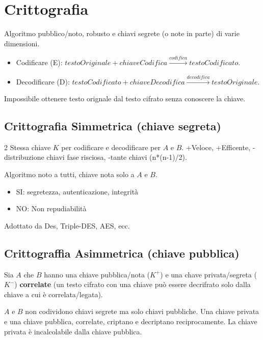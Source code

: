 \section{Crittografia}
Algoritmo pubblico/noto, robusto e chiavi segrete (o note in parte) di varie dimensioni.
\begin{itemize}
	\item Codificare (E): $testoOriginale + chiaveCodifica \stackrel{codifica}{\longrightarrow} testoCodificato$.
	\item Decodificare (D): $testoCodificato + chiaveDecodifica \stackrel{decodifica}{\longrightarrow} testoOriginale$.
\end{itemize}
Impossibile ottenere testo orignale dal testo cifrato senza conoscere la chiave.

\subsection{Crittografia Simmetrica (chiave segreta)}
\begin{multicols}{2}
	\noindent Stessa chiave $K$ per codificare e decodificare per $A$ e $B$.
	+Veloce, +Efficente, -distribuzione chiavi fase risciosa, -tante chiavi (n*(n-1)/2).
	\begin{center}
	\end{center}
	Algoritmo noto a tutti, chiave nota solo a $A$ e $B$.
	\begin{itemize}
		\item SI: segretezza, autenticazione, integrità
		\item NO: Non repudiabilità
	\end{itemize}
	Adottato da Des, Triple-DES, AES, ecc.
\end{multicols}

\subsection{Crittograffia Asimmetrica (chiave pubblica)}
Sia $A$ che $B$ hanno una chiave pubblica/nota ($K^+$) e una chave privata/segreta ($K^-$) \textbf{correlate} (un testo cifrato con una chiave può essere decrifrato solo dalla chiave a cui è correlata/legata).

$A$ e $B$ non codividono chiavi segrete ma solo chiavi pubbliche.
Una chiave privata e una chiave pubblica, correlate, criptano e decriptano reciprocamente. La chiave privata è incalcolabile dalla chiave pubblica.

